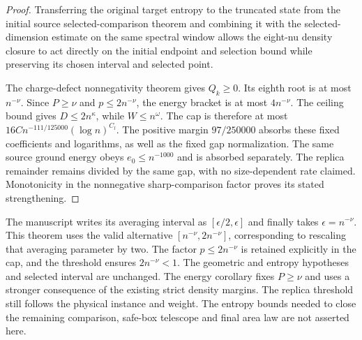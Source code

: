 \begin{proof}
    \leanok
    Transferring the original target entropy to the truncated state from the
    initial source selected-comparison theorem and combining it with the
    selected-dimension estimate on the same spectral window allows the
    eight-nu density closure to act directly on the initial endpoint and
    selection bound while preserving its chosen interval and selected point.

    The charge-defect nonnegativity theorem gives $Q_k\geq0$.
    Its eighth root is at most $n^{-\nu}$.  Since $P\geq\nu$ and
    $p\leq2n^{-\nu}$, the energy bracket is at most $4n^{-\nu}$.
    The ceiling bound gives $D\leq2n^\kappa$, while $W\leq n^\omega$.
    The cap is therefore at most
    $16C n^{-111/125000}(\log n)^{C_l}$.
    The positive margin $97/250000$ absorbs these fixed coefficients
    and logarithms, as well as the fixed gap normalization.
    The same source ground energy obeys $e_0\leq n^{-1000}$ and is
    absorbed separately.  The replica remainder remains divided by the
    same gap, with no size-dependent rate claimed.  Monotonicity in the
    nonnegative sharp-comparison factor proves its stated strengthening.
\end{proof}

The manuscript writes its averaging interval as $[\epsilon/2,\epsilon]$
and finally takes $\epsilon=n^{-\nu}$.  This theorem uses the valid
alternative $[n^{-\nu},2n^{-\nu}]$, corresponding to rescaling that
averaging parameter by two.  The factor $p\leq2n^{-\nu}$ is retained
explicitly in the cap, and the threshold ensures $2n^{-\nu}<1$.
The geometric and entropy hypotheses and selected interval are unchanged.
The energy corollary fixes $P\geq\nu$ and uses a stronger consequence
of the existing strict density margins.  The replica
threshold still follows the physical instance and weight.  The entropy
bounds needed to close the remaining comparison, safe-box telescope and
final area law are not asserted here.
